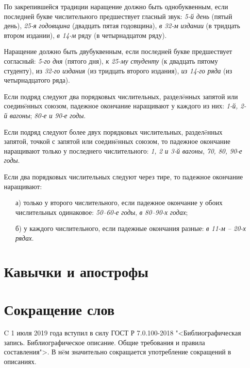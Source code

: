 По закрепившейся традиции наращение должно быть однобуквенным, если последней букве числительного предшествует гласный звук: \emph{5-й день} (пятый день), \emph{25-я годовщина} (двадцать пятая годовщина), \emph{в 32-м издании} (в тридцать втором издании), \emph{в 14-м} ряду (в четырнадцатом ряду).

Наращение должно быть двубуквенным, если последней букве предшествует согласный: \emph{5-го дня} (пятого дня), \emph{к 25-му студенту} (к двадцать пятому студенту), из \emph{32-го издания} (из тридцать второго издания), \emph{из 14-го ряда} (из четырнадцатого ряда).

Если подряд следуют два порядковых числительных, раздел\"eнных запятой или соедин\"eнных союзом, падежное окончание наращивают у каждого из них: \emph{1-й, 2-й вагоны}; \emph{80-е и 90-е годы}.

Если подряд следуют более двух порядковых числительных, раздел\"eнных запятой, точкой с запятой или соедин\"eнных союзом, то падежное окончание наращивают только у последнего числительного: \emph{1, 2 и 3-й вагоны}, \emph{70, 80, 90-е годы}.

Если два порядковых числительных следуют через тире, то падежное окончание наращивают:

\begin{itemize}
    \item[а)] только у второго числительного, если падежное окончание у обоих числительных одинаковое: \emph{50–60-е годы}, \emph{в 80–90-х годах};
    \item [б)] у каждого числительного, если падежные окончания разные: \emph{в 11-м – 20-х рядах}.
\end{itemize}


\section{Кавычки и апострофы}


\section{Сокращение слов}

C 1 июля 2019 года вступил в силу ГОСТ Р 7.0.100-2018 "<Библиографическая запись. Библиографическое описание. Общие требования и правила составления">. В н\"eм значительно сокращается употребление сокращений в описаниях. 

